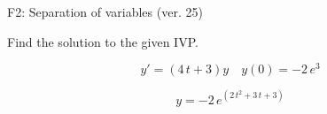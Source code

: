 \begin{exercise}
  \begin{exerciseTitle}F2: Separation of variables (ver. 25)\end{exerciseTitle}
  \begin{exerciseStatement}
    
Find the solution to the given IVP.

    
\[y'=( 4 \, t + 3 )y\hspace{1em} y(0)= -2 \, e^{3}\]

  \end{exerciseStatement}
  \begin{exerciseAnswer}
    
\[y= -2 \, e^{\left(2 \, t^{2} + 3 \, t + 3\right)}\]

  \end{exerciseAnswer}
\end{exercise}